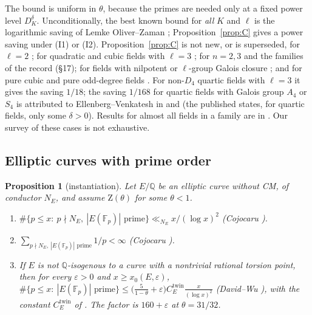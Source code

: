 \documentclass[11pt]{amsart}
\newtheorem{proposition}[theorem]{Proposition}
\theoremstyle{definition}
\theoremstyle{remark}
\newcommand{\Q}{\mathbb{Q}}
\newcommand{\F}{\mathbb{F}}
\newcommand{\Zt}{\mathrm{Z}}       %
\begin{document}
The bound is uniform in $\theta$, because the primes are needed only at a fixed power level $D_K^\delta$.
Unconditionally, the best known bound for \emph{all} $K$ and $\ell$ is the logarithmic saving of Lemke
Oliver--Zaman \cite[Cor.~1]{LOZ}; Proposition~\ref{prop:C} gives a power saving under (I1) or (I2). Proposition~\ref{prop:C} is not new, or is superseded, for $\ell=2$
\cite{BSTTTZ}; for quadratic and cubic fields with $\ell=3$ \cite{EV,CK}; for $n=2,3$ and the families of the record
\cite{Bha} (\S17); for fields with nilpotent or $\ell$-group Galois closure \cite{Wan,KW}; and for pure cubic and pure
odd-degree fields \cite{HB,Wid}. For non-$D_4$ quartic fields with $\ell=3$ it gives the saving $1/18$; the saving
$1/168$ for quartic fields with Galois group $A_4$ or $S_4$ is attributed to Ellenberg--Venkatesh in
\cite[(1.4)]{EPW} and \cite[\S7]{PTW} (the published \cite[Cor.~1]{EV} states, for quartic fields, only some $\delta>0$). Results for almost
all fields in a family are in \cite{PTW,EPW,LOTZ}. Our survey of these cases is not exhaustive.

\subsection{Elliptic curves with prime order}

\begin{proposition}[instantiation]\label{prop:D}
Let $E/\Q$ be an elliptic curve without CM, of conductor $N_E$, and assume $\Zt(\theta)$ for some $\theta<1$.
\begin{enumerate}[label=(\alph*)]
\item $\#\{p\le x:\ p\nmid N_E,\ |E(\F_p)|\text{ prime}\}\ll_{N_E} x/(\log x)^2$ \textup{(Cojocaru \cite[Prop.~7]{Coj05})}.
\item $\sum_{p\nmid N_E,\ |E(\F_p)|\text{ prime}}1/p<\infty$ \textup{(Cojocaru \cite[Cor.~8]{Coj05})}.
\item If $E$ is not $\Q$-isogenous to a curve with a nontrivial rational torsion point, then for every
  $\varepsilon>0$ and $x\ge x_0(E,\varepsilon)$,
  $\#\{p\le x:\ |E(\F_p)|\text{ prime}\}\le\bigl(\frac5{1-\theta}+\varepsilon\bigr)C_E^{\mathrm{twin}}\frac{x}{(\log x)^2}$
  \textup{(David--Wu \cite[Thm.~1.3]{DW})}, with the constant $C_E^{\mathrm{twin}}$ of \cite{DW}. The factor is
  $160+\varepsilon$ at $\theta=31/32$.
\end{enumerate}
\end{proposition}
\end{document}
